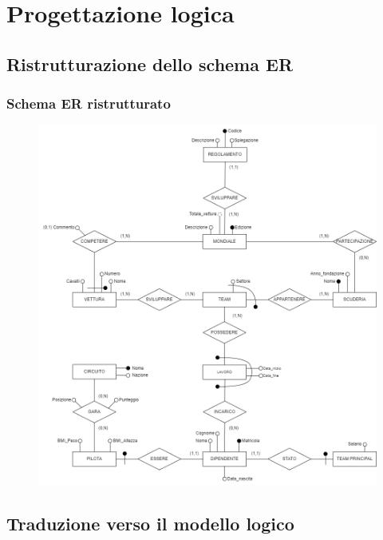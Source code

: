\section{Progettazione logica}
\subsection{Ristrutturazione dello schema ER}

\subsubsection{Schema ER ristrutturato}

\begin{figure}[H]
    \centering
    \includegraphics[scale = 0.45]{Images/ER - Ristrutturato.png}
\end{figure}

\newpage
\subsection{Traduzione verso il modello logico}

